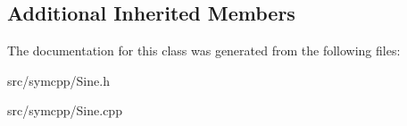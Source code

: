 \subsection*{Additional Inherited Members}


The documentation for this class was generated from the following files\+:\begin{DoxyCompactItemize}
\item 
src/symcpp/Sine.\+h\item 
src/symcpp/Sine.\+cpp\end{DoxyCompactItemize}
